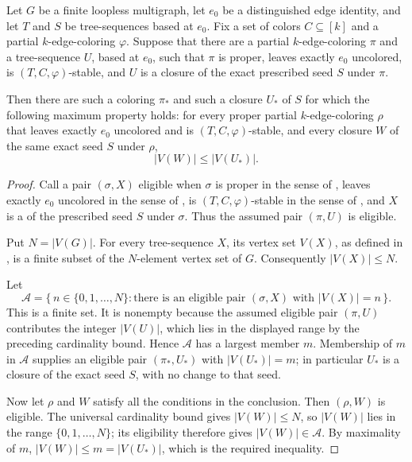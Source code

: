 \begin{lemma}
Let \(G\) be a finite loopless multigraph, let \(e_0\) be a distinguished
edge identity, and let \(T\) and \(S\) be tree-sequences based at \(e_0\).
Fix a set of colors \(C\subseteq [k]\) and a partial \(k\)-edge-coloring
\(\varphi\).  Suppose that there are a partial \(k\)-edge-coloring \(\pi\)
and a tree-sequence \(U\), based at \(e_0\), such that \(\pi\) is proper,
leaves exactly \(e_0\) uncolored, is \((T,C,\varphi)\)-stable, and \(U\) is
a closure of the exact prescribed seed \(S\) under \(\pi\).

Then there are such a coloring \(\pi_*\) and such a closure \(U_*\) of
\(S\) for which the following maximum property holds: for every proper
partial \(k\)-edge-coloring \(\rho\) that leaves exactly \(e_0\) uncolored
and is \((T,C,\varphi)\)-stable, and every closure \(W\) of the same exact
seed \(S\) under \(\rho\),
\[
                         |V(W)|\leq |V(U_*)|.
\]
\end{lemma}
\begin{proof}
Call a pair \((\sigma,X)\) eligible when \(\sigma\) is proper in the sense
of , leaves exactly \(e_0\) uncolored in the
sense of , is
\((T,C,\varphi)\)-stable in the sense of , and
\(X\) is a  of the prescribed seed \(S\) under
\(\sigma\).  Thus the assumed pair \((\pi,U)\) is eligible.

Put \(N=|V(G)|\).  For every tree-sequence \(X\), its vertex set
\(V(X)\), as defined in , is a finite subset
of the \(N\)-element vertex set of \(G\).  Consequently
\(|V(X)|\leq N\).

Let
\[
  \mathcal A=\{\,n\in\{0,1,\ldots,N\}:
       \text{there is an eligible pair }(\sigma,X)
       \text{ with }|V(X)|=n\,\}.
\]
This is a finite set.  It is nonempty because the assumed eligible pair
\((\pi,U)\) contributes the integer \(|V(U)|\), which lies in the displayed
range by the preceding cardinality bound.  Hence \(\mathcal A\) has a
largest member \(m\).  Membership of \(m\) in \(\mathcal A\) supplies an
eligible pair \((\pi_*,U_*)\) with \(|V(U_*)|=m\); in particular \(U_*\) is
a closure of the exact seed \(S\), with no change to that seed.

Now let \(\rho\) and \(W\) satisfy all the conditions in the conclusion.
Then \((\rho,W)\) is eligible.  The universal cardinality bound gives
\(|V(W)|\leq N\), so \(|V(W)|\) lies in the range
\(\{0,1,\ldots,N\}\); its eligibility therefore gives
\(|V(W)|\in\mathcal A\).  By maximality of \(m\),
\(|V(W)|\leq m=|V(U_*)|\), which is the required inequality.
\end{proof}
